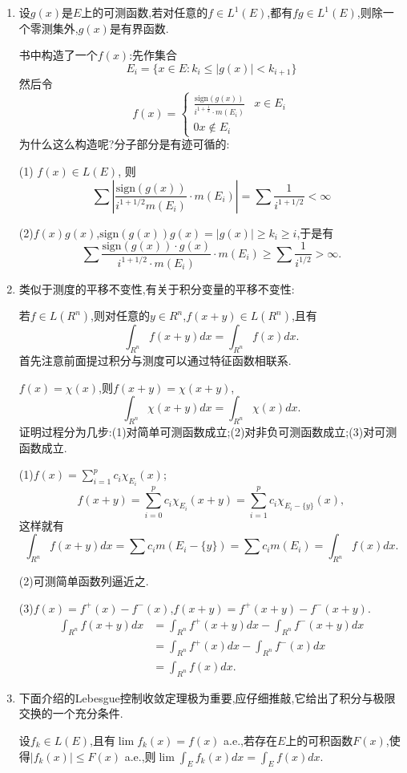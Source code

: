 \documentclass[12pt,a4paper,openany]{book}
\begin{document}
\begin{enumerate}
\item 设$g(x)$是$E$上的可测函数,若对任意的$f \in L^1(E)$,都有$fg \in L^1(E)$,则除一个零测集外,$g(x)$是有界函数.

书中构造了一个$f(x)$:先作集合
\[
E_i = \{x \in E: k_i \le |g(x)| < k_{i+1}\}
\]
然后令
\[
f(x) = \begin{cases}
\frac{\text{sign}(g(x))}{i^{1 + \frac{1}{2}} \cdot m(E_i)} & x \in E_i \\
0 x \notin E_i
\end{cases}
\]
为什么这么构造呢?分子部分是有迹可循的:

(1) $f(x) \in L(E)$, 则
\[
\sum|\frac{\text{sign}(g(x))}{i^{1 + 1/2}m(E_i)} \cdot m(E_i)| = \sum{\frac{1}{i^{1 + 1/2}}} < \infty
\]

(2)$f(x)g(x)$,$\text{sign}(g(x))g(x) = |g(x)| \ge k_i \ge i$,于是有
\[
\sum{\frac{\text{sign}(g(x)) \cdot g(x)}{i^{1+1/2} \cdot m(E_i)} \cdot m(E_i)} \ge \sum{\frac{1}{i^{1/2}}} > \infty.
\]

\item 类似于测度的平移不变性,有关于积分变量的平移不变性:

若$f \in L(R^n)$,则对任意的$y \in R^n$,$f(x+y) \in L(R^n)$,且有
\[
\int_{R^n}{f(x+y)dx} = \int_{R^n}{f(x)dx}.
\]
首先注意前面提过积分与测度可以通过特征函数相联系.

$f(x) = \chi(x)$,则$f(x+y) = \chi(x+y)$,
\[
\int_{R^n}{\chi(x+y)dx} = \int_{R^n}{\chi(x)dx}.
\]
证明过程分为几步:(1)对简单可测函数成立;(2)对非负可测函数成立;(3)对可测函数成立.

(1)$f(x) = \sum_{i=1}^{p}{c_i\chi_{E_i}(x)}$;
\[
f(x + y) = \sum_{i=0}^{p}{c_i\chi_{E_i}(x+y)} = \sum_{i=1}^{p}{c_i\chi_{E_i - \{y\}}(x)},
\]
这样就有
\[
\int_{R^n}{f(x+y)dx} = \sum{c_im(E_i - \{y\})} = \sum{c_im(E_i)} = \int_{R^n}{f(x)dx}.
\]

(2)可测简单函数列逼近之.

(3)$f(x) = f^+(x) - f^-(x)$,$f(x+y)=f^+(x+y)-f^-(x+y)$.
\[
\begin{aligned}
\int_{R^n}{f(x+y)dx} &= \int_{R^n}{f^+(x+y)dx} - \int_{R^n}{f^-(x+y)dx} \\
&=\int_{R^n}{f^+(x)dx} - \int_{R^n}{f^-(x)dx} \\
&=\int_{R^n}{f(x)dx}.
\end{aligned}
\]

\item 下面介绍的Lebesgue控制收敛定理极为重要,应仔细推敲,它给出了积分与极限交换的一个充分条件.

设$f_k \in L(E)$,且有$\lim{f_k(x)}=f(x)$ a.e.,若存在$E$上的可积函数$F(x)$,使得$|f_k(x)| \le F(x)$ a.e.,则$\lim{\int_{E}{f_k(x)dx}} = \int_{E}{f(x)dx}$.


\end{enumerate}
\end{document}
